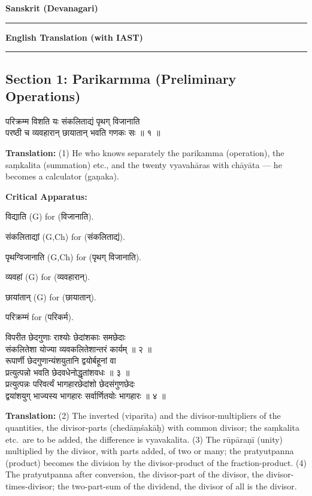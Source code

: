 \documentclass[11pt,a4paper]{article}
\newcommand{\dev}[1]{{\devanagarifont #1}}
\newcommand{\sanskritcol}[1]{%
  \begin{minipage}[t]{0.47\textwidth}
  \vspace{0pt}
  \begin{flushleft}
  #1
  \end{flushleft}
  \end{minipage}%
  \hfill
}
\newcommand{\englishcol}[1]{%
  \begin{minipage}[t]{0.47\textwidth}
  \vspace{0pt}
  \begin{flushleft}
  #1
  \end{flushleft}
  \end{minipage}%
}
\newcommand{\columnheaders}{%
  \noindent
  \begin{minipage}[t]{0.47\textwidth}
  \centering
  \textbf{\large Sanskrit (Devanagari)}\\[0.1cm]
  \rule{0.8\textwidth}{0.5pt}
  \end{minipage}%
  \hfill
  \begin{minipage}[t]{0.47\textwidth}
  \centering
  \textbf{\large English Translation (with IAST)}\\[0.1cm]
  \rule{0.8\textwidth}{0.5pt}
  \end{minipage}%
  \vspace{0.3cm}
  \par
}
\newenvironment{variants}{%
  \small%
  \color{varecolor}%
  \list{}{\leftmargin=2em\itemindent=-1em}%
}{\endlist}
\begin{document}
\vspace{0.3cm}
\columnheaders

\subsection*{Section 1: Parikarmma (Preliminary Operations)}

\noindent
\sanskritcol{\dev{परिक्रम्म विशति यः संकलिताद्यं पृथग् विजानाति} \\ \dev{परष्ठी च व्यवहारान् छायातान् भवति गणकः सः ॥ १ ॥}}
\englishcol{\textbf{Translation:} (1) He who knows separately the parikamma (operation), the
saṃkalita (summation) etc., and the twenty vyavahāras with chāyāta --- he becomes
a calculator (gaṇaka).}

\vspace{0.4cm}
\textcolor{varecolor}{\textbf{Critical Apparatus:}}
\begin{variants}
\item[1.1] \dev{विद्याति} (G) \dev{for} (\dev{विजानाति}).
\item[1.2] \dev{संकलिताद्यां} (G,Ch) \dev{for} (\dev{संकलिताद्यं}).
\item[1.3] \dev{पृथग्विजानाति} (G,Ch) \dev{for} (\dev{पृथग् विजानाति}).
\item[1.4] \dev{व्यवहां} (G) \dev{for} (\dev{व्यवहारान्}).
\item[1.5] \dev{छायांतान्} (G) \dev{for} (\dev{छायातान्}).
\item[1.6] \dev{परिक्रम्मं} \dev{for} (\dev{परिकर्म}).
\end{variants}

\noindent
\sanskritcol{\dev{विपरीत छेदगुणाः राश्योः छेदांशकाः समछेदाः} \\ \dev{संकलितेशा योज्या व्यवकलितेशान्तरं कार्यम् ॥ २ ॥} \\[0.2cm]
\dev{रूपार्णी छेदगुणान्यंशयुतानि द्वयोर्बहूनां वा} \\ \dev{प्रत्युत्पन्नो भवति छेदवधेनोद्धृतांशवधः ॥ ३ ॥} \\[0.2cm]
\dev{प्रत्युत्पन्नः परिवर्त्यं भागहारछेदांशो छेदसंगुणछेदः} \\ \dev{द्वयांशयुग् भाज्यस्य भागहारः सर्वार्णितयोः भागहारः ॥ ४ ॥}}
\englishcol{\textbf{Translation:} (2) The inverted (viparīta) and the divisor-multipliers of
the quantities, the divisor-parts (chedāṃśakāḥ) with common divisor; the saṃkalita
etc.\ are to be added, the difference is vyavakalita. (3) The rūpāraṇī (unity)
multiplied by the divisor, with parts added, of two or many; the pratyutpanna
(product) becomes the division by the divisor-product of the fraction-product.
(4) The pratyutpanna after conversion, the divisor-part of the divisor, the
divisor-times-divisor; the two-part-sum of the dividend, the divisor of all
is the divisor.}
\end{document}
